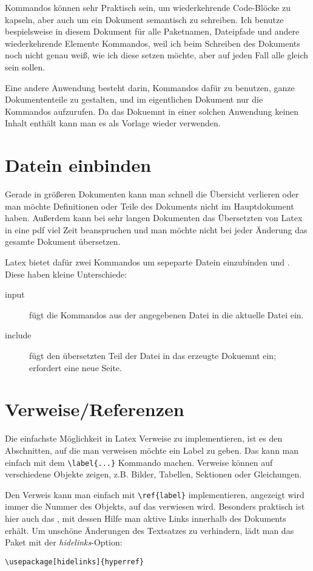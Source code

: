 Kommandos können sehr Praktisch sein, um wiederkehrende Code-Blöcke zu kapseln, aber auch um ein Dokument
semantisch zu schreiben. Ich benutze bespielsweise in diesem Dokument für alle Paketnamen, Dateipfade und
andere wiederkehrende Elemente Kommandos, weil ich beim Schreiben des Dokuments noch nicht genau weiß, wie ich diese
setzen möchte, aber auf jeden Fall alle gleich sein sollen. 

Eine andere Anwendung besteht darin, Kommandos dafür zu benutzen, ganze Dokumententeile zu gestalten, und im
eigentlichen Dokument nur die Kommandos aufzurufen. Da das Dokuemnt in einer solchen Anwendung keinen Inhalt
enthält kann man es als Vorlage wieder verwenden. 

\section{Datein einbinden}
Gerade in größeren Dokumenten kann man schnell die Übersicht verlieren oder man möchte Definitionen oder
Teile des Dokuments nicht im Hauptdokument haben. Außerdem kann bei sehr langen Dokumenten das Übersetzten
von Latex in eine pdf viel Zeit beanspruchen und man möchte nicht bei jeder Änderung das gesamte Dokument
übersetzen. 

Latex bietet dafür zwei Kommandos um sepeparte Datein einzubinden \verb++ und \verb++.
Diese haben kleine Unterschiede:
\begin{description}
  \item[input] fügt die Kommandos aus der angegebenen Datei in die aktuelle Datei ein.
  \item[include] fügt den übersetzten Teil der Datei in das erzeugte Dokuemnt ein; erfordert eine neue
    Seite. 
\end{description}

\section{Verweise/Referenzen}
Die einfachste Möglichkeit in Latex Verweise zu implementieren, ist es den Abschnitten, auf die man verweisen
möchte ein Label zu geben. Das kann man einfach mit dem \verb+\label{...}+ Kommando machen. Verweise können auf
verschiedene Objekte zeigen, z.B. Bilder, Tabellen, Sektionen oder Gleichungen.

Den Verweis kann man einfach mit \verb+\ref{label}+ implementieren, angezeigt wird immer die Nummer des Objekts,
auf das verwiesen wird. Besonders praktisch ist hier auch das , mit dessen Hilfe man aktive
Links innerhalb des Dokuments erhält. Um unschöne Änderungen des Textsatzes zu verhindern, lädt man das Paket mit
der \textit{hidelinks}-Option:
\begin{verbatim}
\usepackage[hidelinks]{hyperref}
\end{verbatim}


